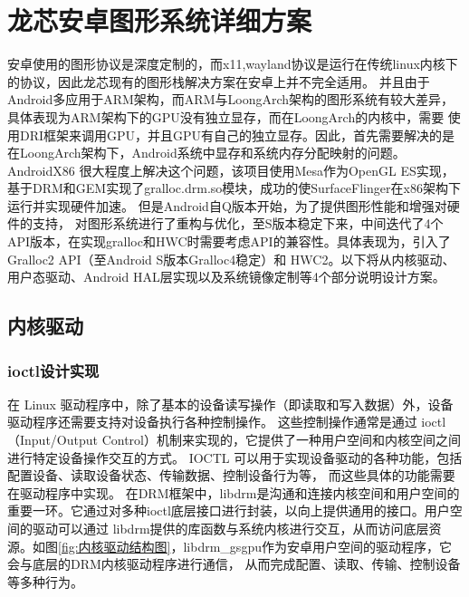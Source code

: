 \section{龙芯安卓图形系统详细方案}
安卓使用的图形协议是深度定制的，而x11,wayland协议是运行在传统linux内核下的协议，因此龙芯现有的图形栈解决方案在安卓上并不完全适用。
并且由于Android多应用于ARM架构，而ARM与LoongArch架构的图形系统有较大差异，具体表现为ARM架构下的GPU没有独立显存\cite{Inki}，而在LoongArch的内核中，需要
使用DRI框架来调用GPU，并且GPU有自己的独立显存。因此，首先需要解决的是在LoongArch架构下，Android系统中显存和系统内存分配映射的问题。AndroidX86\cite{AndroidX86}
很大程度上解决这个问题，该项目使用Mesa作为OpenGL ES实现，基于DRM和GEM实现了gralloc.drm.so模块，成功的使SurfaceFlinger在x86架构下运行并实现硬件加速\cite{XTYY201710015}。
但是Android自Q版本开始，为了提供图形性能和增强对硬件的支持，
对图形系统进行了重构与优化，至S版本稳定下来，中间迭代了4个API版本，在实现gralloc和HWC时需要考虑API的兼容性。具体表现为，引入了Gralloc2 API（至Android S版本Gralloc4稳定）和
HWC2。以下将从内核驱动、用户态驱动、Android HAL层实现以及系统镜像定制等4个部分说明设计方案。

\subsection{内核驱动}


\subsubsection{ioctl设计实现}

在 Linux 驱动程序中，除了基本的设备读写操作（即读取和写入数据）外，设备驱动程序还需要支持对设备执行各种控制操作。
这些控制操作通常是通过 ioctl（Input/Output Control）机制来实现的，它提供了一种用户空间和内核空间之间进行特定设备操作交互的方式。
IOCTL 可以用于实现设备驱动的各种功能，包括配置设备、读取设备状态、传输数据、控制设备行为等， 而这些具体的功能需要在驱动程序中实现。
在DRM框架中，libdrm是沟通和连接内核空间和用户空间的重要一环。它通过对多种ioctl底层接口进行封装，以向上提供通用的接口。用户空间的驱动可以通过
libdrm提供的库函数与系统内核进行交互，从而访问底层资源。如图\ref{fig:内核驱动结构图}，libdrm\_gsgpu作为安卓用户空间的驱动程序，它会与底层的DRM内核驱动程序进行通信，
从而完成配置、读取、传输、控制设备等多种行为。

